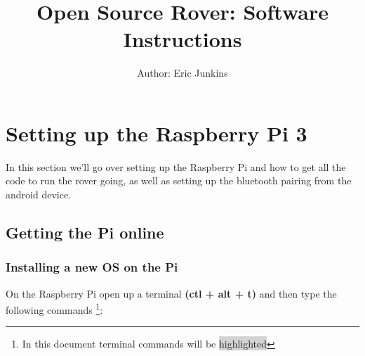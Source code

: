 \documentclass[12pt]{article}
\begin{document}
\title{Open Source Rover: Software Instructions}
\author{Author: Eric Junkins}

\makeatletter         
\def\@maketitle{
\begin{center}	
	\makebox[\textwidth][c]{ \texttt{[image: "Pictures/software title".png]}}
	{\Huge \bfseries \sffamily \@title }\\[3ex] 
	{\Large\sffamily \@author}\\[3ex] 
	\texttt{[image: "Pictures/JPL logo".png]}
\end{center}}
\makeatother

\maketitle



\newpage


\tableofcontents

\newpage


\section{Setting up the Raspberry Pi 3}
In this section we'll go over setting up the Raspberry Pi and how to get all the code to run the rover going, as well as setting up the bluetooth pairing from the android device.
\subsection{Getting the Pi online}

\subsubsection{Installing a new OS on the Pi}

On the Raspberry Pi open up a terminal \textbf{(ctl + alt + t)} and then type the following commands \footnote{In this document terminal commands will be \colorbox{lightgray}{highlighted}}:
\end{document}
